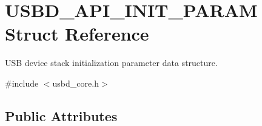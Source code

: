 \hypertarget{struct_u_s_b_d___a_p_i___i_n_i_t___p_a_r_a_m}{}\section{U\+S\+B\+D\+\_\+\+A\+P\+I\+\_\+\+I\+N\+I\+T\+\_\+\+P\+A\+R\+AM Struct Reference}
\label{struct_u_s_b_d___a_p_i___i_n_i_t___p_a_r_a_m}


U\+SB device stack initialization parameter data structure.  




{\ttfamily \#include $<$usbd\+\_\+core.\+h$>$}

\subsection*{Public Attributes}
